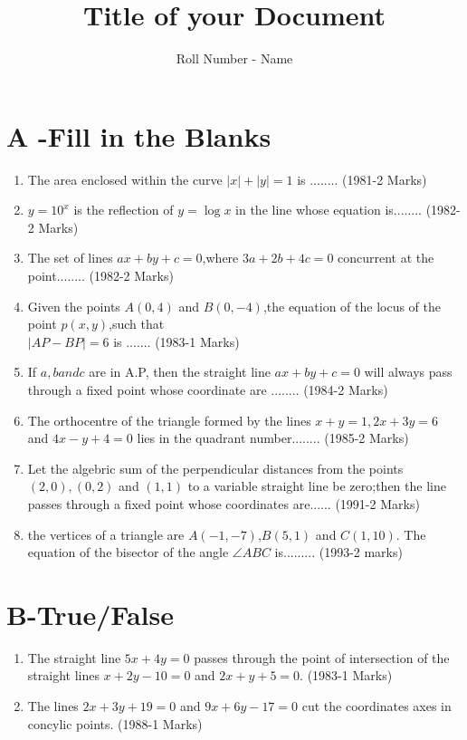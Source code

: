 \documentclass[journal,12pt,twocolumn]{IEEEtran}
\theoremstyle{remark}
\begin{document}

\vspace{3cm}

\title{Title of your Document}
\author{Roll Number - Name}
\maketitle
\newpage
\bigskip

\renewcommand{\thefigure}{\theenumi}
\renewcommand{\thetable}{\theenumi}

\section {A -Fill in the Blanks}
\begin{enumerate}
    \item The area enclosed within the curve $|x|+|y| =1$ is ........
    \hfill(1981-2 Marks)
    \item $y = 10^x $ is the reflection of $y=\log x$ in the  line whose equation is........
    \hfill(1982-2 Marks)
    \item The set of lines $ax+by+c=0$,where $3a+2b+4c=0$ concurrent at the point........
    \hfill(1982-2 Marks)
    \item Given the points $A(0,4)$ and $B(0,-4)$,the equation of the locus of the point $p(x,y)$,such that \\
    $|AP-BP|=6$ is .......
    \hfill(1983-1 Marks)
    \item If $a,b and c$ are in A.P, then the straight line $ax +by +c=0$ will always pass through a fixed point whose coordinate are ........
    \hfill(1984-2 Marks)
    \item The orthocentre of the triangle formed by the lines $x+y=1,2x +3y=6$ and $4x-y+4=0$ lies in the quadrant number........
    \hfill(1985-2 Marks)
    \item Let the algebric sum of the perpendicular distances from the points $(2,0),(0,2)$ and $(1,1)$ to a variable straight line be zero;then the line passes through a fixed point whose coordinates are......
    \hfill(1991-2 Marks)
    \item the vertices of a triangle are $A(-1,-7)$,$B(5,1)$ and $C(1,10)$. The equation of the bisector of the angle $\angle{ABC}$ is.........
    \hfill(1993-2 marks)
\end{enumerate}
\section {B-True/False}
\begin{enumerate}
    \item The straight line $5x+4y=0$ passes through the point of intersection of the straight lines $x+2y-10=0$ and $2x+y+5=0$.
    \hfill(1983-1 Marks)
    \item The lines $2x+3y+19=0$ and $9x+6y-17=0$ cut the coordinates axes in concylic points.
    \hfill(1988-1 Marks)
\end{enumerate}
\end{document}
